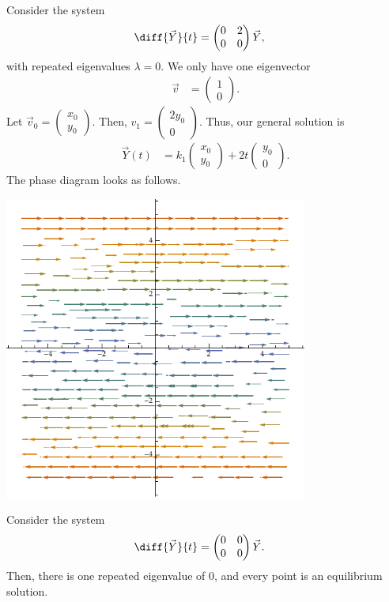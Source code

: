 \documentclass[10pt]{mypackage}
\begin{document}
\begin{example}
  Consider the system
  \begin{align*}
    \diff{\vec{Y}}{t} &= \begin{pmatrix}0 & 2 \\ 0 & 0\end{pmatrix}\vec{Y},
  \end{align*}
  with repeated eigenvalues $\lambda = 0$. We only have one eigenvector
  \begin{align*}
    \vec{v}  &= \begin{pmatrix}1\\0\end{pmatrix}.
  \end{align*}
  Let $\vec{v}_0 = \begin{pmatrix}x_0\\y_0\end{pmatrix}$. Then, $v_1 = \begin{pmatrix}2y_0\\0\end{pmatrix}$. Thus, our general solution is
  \begin{align*}
    \vec{Y}(t) &= k_1 \begin{pmatrix}x_0\\y_0\end{pmatrix} + 2t \begin{pmatrix}y_0\\0\end{pmatrix}.
  \end{align*}
  The phase diagram looks as follows.
  \begin{center}
    \includegraphics[width=10cm]{images/one_eigenvector_zero_eigenvalue.pdf}
  \end{center}
\end{example}
\begin{example}
  Consider the system
  \begin{align*}
    \diff{\vec{Y}}{t} &= \begin{pmatrix}0 & 0 \\ 0 & 0\end{pmatrix} \vec{Y}.
  \end{align*}
  Then, there is one repeated eigenvalue of $0$, and every point is an equilibrium solution.
\end{example}
\end{document}
